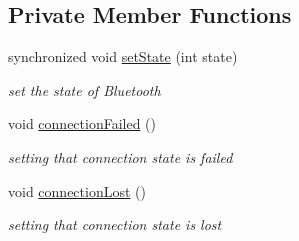 \subsection*{Private Member Functions}
\begin{DoxyCompactItemize}
\item 
synchronized void \mbox{\hyperlink{classhi_1_1world_1_1hello_1_1myapplication_1_1_bluetooth_service_abb2cc270f42e37935a1e109e5dade414}{set\+State}} (int state)
\begin{DoxyCompactList}\small\item\em set the state of Bluetooth \end{DoxyCompactList}\item 
void \mbox{\hyperlink{classhi_1_1world_1_1hello_1_1myapplication_1_1_bluetooth_service_aa962cc70fbadf81e4fe92c45a08070b0}{connection\+Failed}} ()
\begin{DoxyCompactList}\small\item\em setting that connection state is failed \end{DoxyCompactList}\item 
void \mbox{\hyperlink{classhi_1_1world_1_1hello_1_1myapplication_1_1_bluetooth_service_a21ad0d0ad813783648751de971c67209}{connection\+Lost}} ()
\begin{DoxyCompactList}\small\item\em setting that connection state is lost \end{DoxyCompactList}\end{DoxyCompactItemize}
